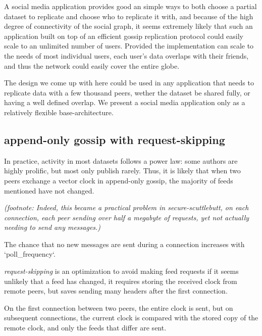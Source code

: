 \documentclass[sigconf]{acmart}
\begin{document}
A social media application provides good an simple ways to both choose
a partial dataset to replicate and choose who to replicate it with,
and because of the high degree of connectivity of the social graph, it
seems extremely likely that such an application built on top of an
efficient gossip replication protocol could easily scale to an
unlimited number of users. Provided the implementation can scale to
the needs of most individual users, each user's data overlaps with
their friends, and thus the network could easily cover the entire
globe.

The design we come up with here could be used in any application that
needs to replicate data with a few thousand peers, wether the dataset
be shared fully, or having a well defined overlap.  We present a
social media application only as a relatively flexible
base-architecture.

\subsection{append-only gossip with request-skipping}

In practice, activity in most datasets follows a power law: some
authors are highly prolific, but most only publish rarely.  Thus, it
is likely that when two peers exchange a vector clock in append-only
gossip, the majority of feeds mentioned have not changed.

{\em (footnote: Indeed, this became a practical problem in secure-scuttlebutt,
on each connection, each peer sending over half a megabyte of requests,
yet not actually needing to send any messages.)}

The chance that no new messages are sent during a connection increases
with `poll\_frequency`.

{\em request-skipping} is an optimization to avoid making feed
requests if it seems unlikely that a feed has changed, it requires
storing the received clock from remote peers, but saves sending many
headers after the first connection.

On the first connection between two peers, the entire clock is sent,
but on subsequent connections, the current clock is compared with the
stored copy of the remote clock, and only the feeds that differ are
sent.
\end{document}
